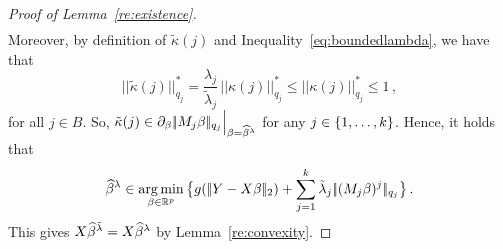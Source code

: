 \documentclass[bj]{imsart}
\newcommand{\normtwo}[1]{\ensuremath{\!|\!| #1 | \! |_{2}}}
\newcommand{\normqj}[1]{\ensuremath{\!|\!| #1 | \! |_{q_j}}}
\newcommand{\normqjd}[1]{\ensuremath{\!|\!| #1 | \! |_{q_j}^*}}
\newcommand{\1}{{\rm 1}\mskip -4,5mu{\rm l} }
\newcommand{\argmin}{\mathop{\mathrm{arg\,min}}}
\def\R{\mathbb{R}}
\begin{document}
\begin{proof}[Proof of Lemma~\ref{re:existence}]
\begin{align*}
\end{align*}
Moreover, by definition of $\tilde \kappa(j)$ and Inequality~\eqref{eq:boundedlambda}, we have that 
\begin{equation*}
\normqjd{\tilde\kappa(j)}=\frac{\lambda_j}{\tilde \lambda_j}\,\normqjd{\kappa(j)} \leq \normqjd{\kappa(j)}\le 1\,,
\end{equation*}
for all $j\in B$. So,  $\tilde \kappa(j)\in\partial_{\beta}\, \normqj{\fusedmatrix_j\beta}\Big|_{\beta=\estimatort}$ for any $j\in\{1,\dots,k\}$.
Hence, it holds that
\begin{equation*}
\estimatort\in \argmin_{\beta\in\R^p} \big\{ g(\,\normtwo{\outcome-\design\beta})+\sum_{j=1}^\numbergroups\tilde\lambda_j\,\normqj{(\fusedmatrix_j\beta)^j}\big\}\,.
\end{equation*}
This gives $\textcolor{black}{X}\widehat \beta^{\tilde{\lambda}}=\textcolor{black}{X}\widehat \beta^{\lambda}$  by  Lemma~\ref{re:convexity}.\vspace{2mm}
  

\end{proof}
\end{document}
